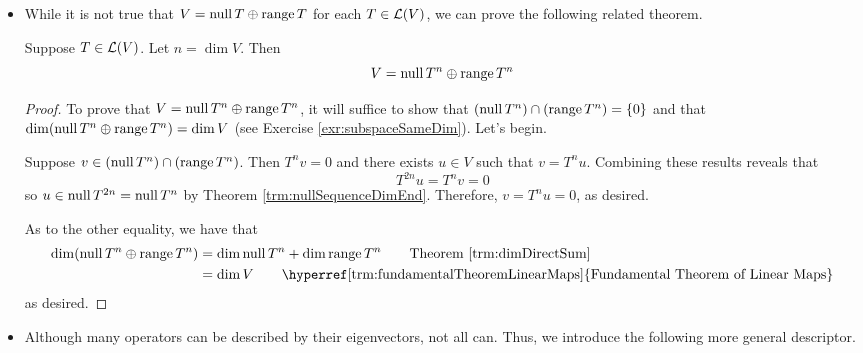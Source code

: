 \documentclass[../main.tex]{subfiles}
\begin{document}
\begin{itemize}
\begin{theorem}
\begin{proof}
            At each of these strict inclusions, the dimension from the previous to the next null space must increase by at least one. Thus, $\dim\nul T^{n+1}\geq n+1$. But since $\nul T^{n+1}\subset V$, Theorem \ref{trm:dimSubspaces} asserts that $\dim\nul T^{n+1}\leq n$, so we have that
            \begin{equation*}
                n+1 \leq \dim\nul T^{n+1} \leq n
            \end{equation*}
            a contradiction.
        \end{proof}
    \end{theorem}
    \item While it is not true that $V=\operatorname{null} T\oplus\operatorname{range} T$ for each $T\in\mathcal{L}(V)$, we can prove the following related theorem.
    \begin{theorem}\label{trm:nulRangeDimPower}
        Suppose $T\in\mathcal{L}(V)$. Let $n=\dim V$. Then
        \begin{equation*}
            V = \operatorname{null} T^n\oplus\operatorname{range} T^n
        \end{equation*}
        \begin{proof}
            To prove that $V=\operatorname{null} T^n\oplus\operatorname{range} T^n$, it will suffice to show that $(\operatorname{null} T^n)\cap(\operatorname{range} T^n)=\{0\}$ and that $\dim(\operatorname{null} T^n\oplus\operatorname{range} T^n)=\dim V$ (see Exercise \ref{exr:subspaceSameDim}). Let's begin.\par
            Suppose $v\in(\operatorname{null} T^n)\cap(\operatorname{range} T^n)$. Then $T^nv=0$ and there exists $u\in V$ such that $v=T^nu$. Combining these results reveals that
            \begin{equation*}
                T^{2n}u = T^nv = 0
            \end{equation*}
            so $u\in\operatorname{null} T^{2n}=\operatorname{null} T^n$ by Theorem \ref{trm:nullSequenceDimEnd}. Therefore, $v=T^nu=0$, as desired.\par
            As to the other equality, we have that
            \begin{align*}
                \dim(\nul T^n\oplus\range T^n) &= \dim\nul T^n+\dim\range T^n\tag*{Theorem \ref{trm:dimDirectSum}}\\
                &= \dim V\tag*{\hyperref[trm:fundamentalTheoremLinearMaps]{Fundamental Theorem of Linear Maps}}
            \end{align*}
            as desired.
        \end{proof}
    \end{theorem}
    \item Although many operators can be described by their eigenvectors, not all can. Thus, we introduce the following more general descriptor.

\end{itemize}
\end{document}
